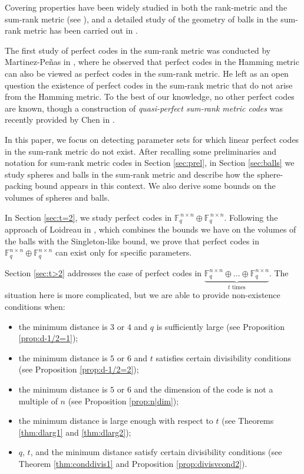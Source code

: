 \documentclass[11pt]{amsart}
\theoremstyle{definition}
\newcommand{\F}{{\mathbb F}}
\begin{document}
Covering properties have been widely studied in both the rank-metric and the sum-rank metric (see \cite{bartoli2024saturating,bonini2023saturating,bonini2024geometry,zullo2024saturating}), and a detailed study of the geometry of balls in the sum-rank metric has been carried out in \cite{sauerbier2025bounds,puchinger2022generic,byrne2021fundamental,ott2021bounds}.  

The first study of perfect codes in the sum-rank metric was conducted by Martinez-Pe\~nas in \cite{martinezpenas2021hamming}, where he observed that perfect codes in the Hamming metric can also be viewed as perfect codes in the sum-rank metric. He left as an open question the existence of perfect codes in the sum-rank metric that do not arise from the Hamming metric. To the best of our knowledge, no other perfect codes are known, though a construction of \emph{quasi-perfect sum-rank metric codes} was recently provided by Chen in \cite{chen2024quasi}.  

In this paper, we focus on detecting parameter sets for which linear perfect codes in the sum-rank metric do not exist.  
After recalling some preliminaries and notation for sum-rank metric codes in Section \ref{sec:prel}, in Section \ref{sec:balls} we study spheres and balls in the sum-rank metric and describe how the sphere-packing bound appears in this context. We also derive some bounds on the volumes of spheres and balls.  

In Section \ref{sec:t=2}, we study perfect codes in $\mathbb{F}_q^{\,n\times n} \oplus \mathbb{F}_q^{\,n\times n}$. Following the approach of Loidreau in \cite{loidreau2006properties}, which combines the bounds we have on the volumes of the balls with the Singleton-like bound, we prove that perfect codes in $\mathbb{F}_q^{n\times n} \oplus \mathbb{F}_q^{n\times n}$ can exist only for specific parameters.  

Section \ref{sec:t>2} addresses the case of perfect codes in $\underbrace{\mathbb{F}_q^{n\times n}\oplus \ldots \oplus \F_q^{n\times n}}_{t \text{ times}}$. The situation here is more complicated, but we are able to provide non-existence conditions when:  
\begin{itemize}
    \item the minimum distance is $3$ or $4$ and $q$ is sufficiently large (see Proposition \ref{prop:d-1/2=1});  
    \item the minimum distance is $5$ or $6$ and $t$ satisfies certain divisibility conditions (see Proposition \ref{prop:d-1/2=2});  
    \item the minimum distance is $5$ or $6$ and the dimension of the code is not a multiple of $n$ (see Proposition \ref{prop:n|dim});  
    \item the minimum distance is large enough with respect to $t$ (see Theorems \ref{thm:dlarg1} and \ref{thm:dlarg2});  
    \item $q$, $t$, and the minimum distance satisfy certain divisibility conditions (see Theorem \ref{thm:conddivis1} and Proposition \ref{prop:divisvcond2}).  
\end{itemize}  
\end{document}
